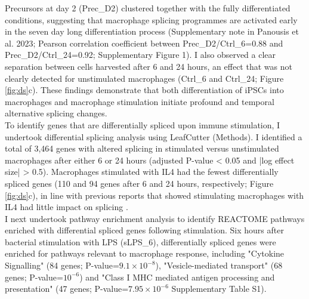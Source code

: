 Precursors at day 2 (Prec\_D2) clustered together with the fully differentiated conditions, suggesting that macrophage splicing programmes are activated early in the seven day long differentiation process (Supplementary note in Panousis et al. 2023; Pearson correlation coefficient between Prec\_D2/Ctrl\_6=0.88 and Prec\_D2/Ctrl\_24=0.92; Supplementary Figure 1). I also observed a clear separation between cells harvested after 6 and 24 hours, an effect that was not clearly detected for unstimulated macrophages (Ctrl\_6 and Ctrl\_24; Figure \ref{fig:ds}c). These findings demonstrate that both differentiation of iPSCs into macrophages and macrophage stimulation initiate profound and temporal alternative splicing changes. \\

To identify genes that are differentially spliced upon immune stimulation, I undertook differential splicing analysis using LeafCutter (Methods). I identified a total of 3,464 genes with altered splicing in stimulated versus unstimulated macrophages after either 6 or 24 hours (adjusted P-value < 0.05 and |log effect size| > 0.5). Macrophages stimulated with IL4 had the fewest differentially spliced genes (110 and 94 genes after 6 and 24 hours, respectively; Figure \ref{fig:ds}c), in line with previous reports that showed stimulating macrophages with IL4 had little impact on splicing \cite{Liu2018-fh}. \\

I next undertook pathway enrichment analysis to identify REACTOME pathways enriched with differential spliced genes following stimulation. Six hours after bacterial stimulation with LPS (sLPS\_6), differentially spliced genes were enriched for pathways relevant to macrophage response, including "Cytokine Signalling" (84 genes; P-value=$9.1\times10^{-8}$), "Vesicle-mediated transport" (68 genes; P-value=$10^{-6}$) and "Class I MHC mediated antigen processing and presentation" (47 genes; P-value=$7.95\times10^{-6}$ Supplementary Table S1).\\


